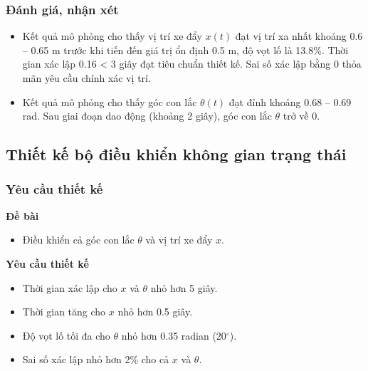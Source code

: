 \documentclass[12pt,a4paper]{article}
\begin{document}
\subsubsection{Đánh giá, nhận xét}
\begin{itemize}
    \item Kết quả mô phỏng cho thấy vị trí xe đẩy $x(t)$ đạt vị trí xa nhất khoảng 0.6 -- 0.65 m trước khi tiến đến giá trị ổn định 0.5 m, độ vọt lố là 13.8\%.  Thời gian xác lập 0.16 < 3 giây đạt tiêu chuẩn thiết kế. Sai số xác lập bằng 0 thỏa mãn yêu cầu chính xác vị trí.
    \item Kết quả mô phỏng cho thấy góc con lắc $\theta(t)$ đạt đỉnh khoảng 0.68 -- 0.69 rad. Sau giai đoạn dao động (khoảng 2 giây), góc con lắc $\theta$ trở về 0.

\end{itemize}


\subsection{Thiết kế bộ điều khiển không gian trạng thái}
\subsubsection{Yêu cầu thiết kế}
\begin{minipage}[t]{0.3\linewidth}
    \textbf{Đề bài}
\end{minipage}\begin{minipage}[t]{0.6\linewidth}
    \begin{itemize}
        \item Điều khiển cả góc con lắc $\theta$ và vị trí xe đẩy $x$.
    \end{itemize}
\end{minipage}

\vspace{\baselineskip}

\begin{minipage}[t]{0.3\linewidth}
    \textbf{Yêu cầu thiết kế}
\end{minipage}\begin{minipage}[t]{0.6\linewidth}
    \begin{itemize}[noitemsep,topsep=0pt]
        \item Thời gian xác lập cho $x$ và $\theta$ nhỏ hơn 5 giây.
        \item Thời gian tăng cho $x$ nhỏ hơn 0.5 giây. 
        \item Độ vọt lố tối đa cho $\theta$ nhỏ hơn 0.35 radian (20$^\circ$). 
        \item Sai số xác lập nhỏ hơn 2\% cho cả $x$ và $\theta$. 
    \end{itemize}
\end{minipage}
\end{document}
